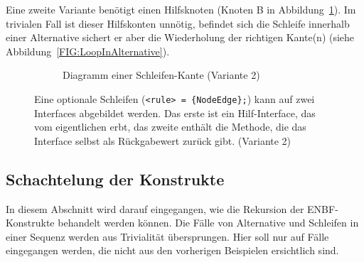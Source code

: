 \documentclass[../InterneDSLs.tex]{subfiles}
\begin{document}
Eine zweite Variante benötigt einen Hilfsknoten (Knoten B in Abbildung~\ref{FIG:DiagramLoopNodeAlt}). Im trivialen Fall ist dieser Hilfskonten unnötig, befindet sich die Schleife innerhalb einer Alternative sichert er aber die Wiederholung der richtigen Kante(n) (siehe Abbildung~\ref{FIG:LoopInAlternative}).
\begin{figure}[ht]
\centering
  \begin{subfigure}[c]{0.49\textwidth}
    \caption{Diagramm einer Schleifen-Kante (Variante 2)}
    \label{FIG:DiagramLoopNodeAlt}
  \end{subfigure}
  \begin{subfigure}[c]{0.49\textwidth}
    
  \end{subfigure}
  \caption{Eine optionale Schleifen (\texttt{<rule> = \{NodeEdge\};}) kann auf zwei Interfaces abgebildet werden. Das erste ist ein Hilf-Interface, das vom eigentlichen erbt, das zweite enthält die Methode, die das Interface selbst als Rückgabewert zurück gibt. (Variante 2)}
  \label{FIG:LoopNodeAlt}
\end{figure}


\subsection{Schachtelung der Konstrukte}
In diesem Abschnitt wird darauf eingegangen, wie die Rekursion der ENBF-Konstrukte behandelt werden können. Die Fälle von Alternative und Schleifen in einer Sequenz werden aus Trivialität übersprungen. Hier soll nur auf Fälle eingegangen werden, die nicht aus den vorherigen Beispielen ersichtlich sind.
\end{document}
